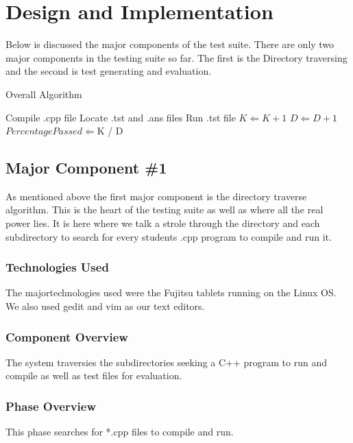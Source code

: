 \chapter{Design  and Implementation}
Below is discussed the major components of the test suite. There are only two major components in the testing suite so far. The first is the Directory traversing and the second is test generating and evaluation.

\begin{algorithm} [tbh]              %
\caption{Overall Algorithm}
\label{algover}
\begin{algorithmic}
	\STATE Compile .cpp file
	\STATE Locate .tst and .ans files
		\STATE Run .tst file
			\STATE $K \Leftarrow K + 1$
		\ENDIF
		\STATE $D \Leftarrow D + 1$
	\ENDWHILE
	\STATE $Percentage Passed \Leftarrow $K / D
\end{algorithmic}
\end{algorithm}


\section{Major Component \#1 }
As mentioned above the first major component is the directory traverse algorithm. This is the heart of the testing suite as well as where all the real power lies. It is here where we talk a strole through the directory and each subdirectory to search for every students .cpp program to compile and run it.

\subsection{Technologies  Used}
The majortechnologies used were the Fujitsu tablets running on the Linux OS. We also used gedit and vim as our text editors.

\subsection{Component  Overview}
The system traversies the subdirectories seeking a C++ program to run and compile as well as test files for evaluation.

\subsection{Phase Overview}
This phase searches for *.cpp files to compile and run.

